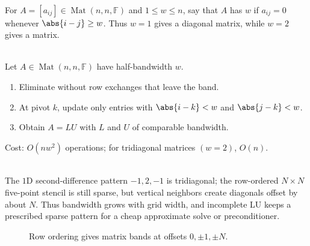 \begin{definition} \label{def:band-and-tridiagonal-matrix} \\
For $A=[a_{ij}]\in\operatorname{Mat}(n,n,\mathbb{F})$ and $1\leq w\leq n$, say that $A$ has  $w$ if $a_{ij}=0$ whenever $\abs{i-j}\geq w$. Thus $w=1$ gives a diagonal matrix, while $w=2$ gives a  matrix.
\end{definition}

\begin{method} \label{meth:banded-elimination-preview} \\
Let $A\in\operatorname{Mat}(n,n,\mathbb{F})$ have half-bandwidth $w$.
\begin{enumerate}[label=(\roman*)]
\setlength{\itemsep}{0pt}
\item Eliminate without row exchanges that leave the band.
\item At pivot $k$, update only entries with $\abs{i-k}<w$ and $\abs{j-k}<w$.
\item Obtain $A=LU$ with $L$ and $U$ of comparable bandwidth.
\end{enumerate}
Cost: $O(nw^2)$ operations; for tridiagonal matrices $(w=2)$, $O(n)$.
\end{method}

\begin{perspective} \label{per:five-point-stencil-bandwidth} \\
The $1$D second-difference pattern $-1,2,-1$ is tridiagonal; the row-ordered $N\times N$ five-point stencil is still sparse, but vertical neighbors create diagonals offset by about $N$. Thus bandwidth grows with grid width, and incomplete LU keeps a prescribed sparse pattern for a cheap approximate solve or preconditioner.
\end{perspective}

\begin{figure}[H]
  \centering
  
  \caption{Row ordering gives matrix bands at offsets $0,\pm1,\pm N$.}
  \label{fig:five-point-stencil-bandwidth}
\end{figure}
